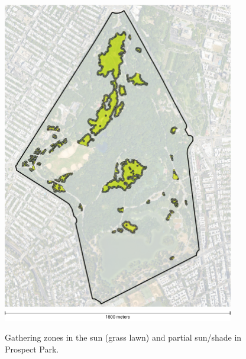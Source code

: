 \newpage
\null
\vfill
\begin{figure}[H]
  \centering
  \captionsetup{width=0.9\textwidth}
  \includegraphics[width=0.9\textwidth]{images/gatherings/prospect_locations.png} \\
  \vspace{10pt}
  \includegraphics[width=0.9\textwidth]{images/gatherings/scale_legend_2.png}
  \caption[Prospect Park - gathering zones]{Gathering zones in the sun (grass lawn) and partial sun/shade in Prospect Park.}
  \label{fig:prospect_gathering}
\end{figure}

